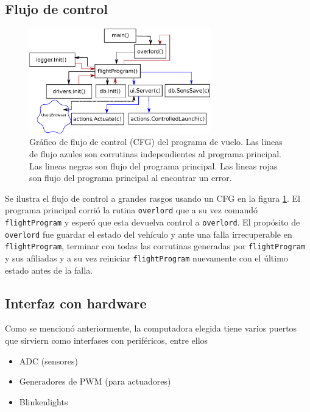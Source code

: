 \subsection{Flujo de control}
\begin{figure}[!htb]
    \centering
    \includegraphics[width=0.7\textwidth]{fig/cfg_flightprogram.eps}
    \caption{Gráfico de flujo de control (CFG) del programa de vuelo. Las lineas de flujo azules son corrutinas independientes al programa principal. Las lineas negras son flujo del programa principal. Las lineas rojas son flujo del programa principal al encontrar un error.}
    \label{fig:flightProgram}
\end{figure}

Se ilustra el flujo de control a grandes rasgos usando un CFG en la figura \ref{fig:flightProgram}. El programa principal corrió la rutina \texttt{overlord} que a su vez comandó \texttt{flightProgram} y esperó que esta devuelva control a \texttt{overlord}. El propósito de \texttt{overlord} fue guardar el estado del vehículo y ante una falla irrecuperable en \texttt{flightProgram}, terminar con todas las corrutinas generadas por \texttt{flightProgram} y sus afiliadas y a su vez reiniciar \texttt{flightProgram} nuevamente con el último estado antes de la falla.


\subsection{Interfaz con hardware}

Como se mencionó anteriormente, la computadora elegida tiene varios puertos que sirviern como interfases con periféricos, entre ellos 

\begin{itemize}
    \item ADC (sensores)
    \item Generadores de PWM (para actuadores)
    \item Blinkenlights
\end{itemize}

